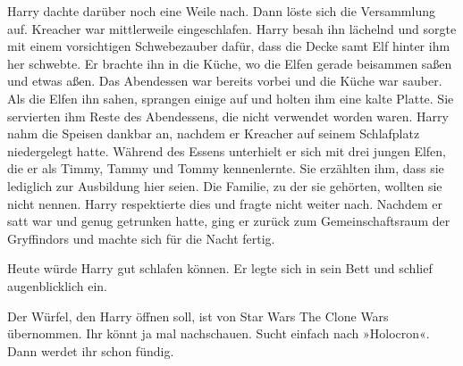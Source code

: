 Harry dachte darüber noch eine Weile nach. Dann löste sich die Versammlung auf. Kreacher war mittlerweile eingeschlafen. Harry besah ihn lächelnd und sorgte mit einem vorsichtigen Schwebezauber dafür, dass die Decke samt Elf hinter ihm her schwebte. Er brachte ihn in die Küche, wo die Elfen gerade beisammen saßen und etwas aßen. Das Abendessen war bereits vorbei und die Küche war sauber. Als die Elfen ihn sahen, sprangen einige auf und holten ihm eine kalte Platte. Sie servierten ihm Reste des Abendessens, die nicht verwendet worden waren. Harry nahm die Speisen dankbar an, nachdem er Kreacher auf seinem Schlafplatz niedergelegt hatte. Während des Essens unterhielt er sich mit drei jungen Elfen, die er als Timmy, Tammy und Tommy kennenlernte. Sie erzählten ihm, dass sie lediglich zur Ausbildung hier seien. Die Familie, zu der sie gehörten, wollten sie nicht nennen. Harry respektierte dies und fragte nicht weiter nach. Nachdem er satt war und genug getrunken hatte, ging er zurück zum Gemeinschaftsraum der Gryffindors und machte sich für die Nacht fertig.

Heute würde Harry gut schlafen können. Er legte sich in sein Bett und schlief augenblicklich ein.




\begin{kommentar}
Der Würfel, den Harry öffnen soll, ist von Star Wars The Clone Wars übernommen. Ihr könnt ja mal nachschauen. Sucht einfach nach »Holocron«. Dann werdet ihr schon fündig.
\end{kommentar}
